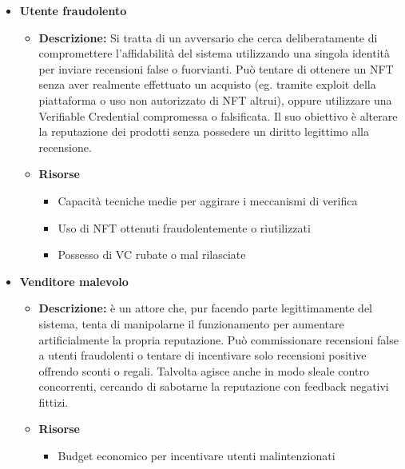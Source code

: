         \begin{itemize}
            \item \textbf{Utente fraudolento}
                \begin{itemize}                    
                    \item \textbf{Descrizione:}  Si tratta di un avversario che cerca deliberatamente di compromettere l'affidabilità del sistema utilizzando una singola identità per inviare recensioni false o fuorvianti. Può tentare di ottenere un NFT senza aver realmente effettuato un acquisto (eg. tramite exploit della piattaforma o uso non autorizzato di NFT altrui), oppure utilizzare una Verifiable Credential compromessa o falsificata. Il suo obiettivo è alterare la reputazione dei prodotti senza possedere un diritto legittimo alla recensione.
                   
                    \item \textbf{Risorse}
                        \begin{itemize}
                            \item Capacità tecniche medie per aggirare i meccanismi di verifica
    
                            \item Uso di NFT ottenuti fraudolentemente o riutilizzati
    
                            \item Possesso di VC rubate o mal rilasciate
                        \end{itemize}
                \end{itemize}
    
            \item \textbf{Venditore malevolo}
                \begin{itemize}                    
                    \item \textbf{Descrizione:} è un attore che, pur facendo parte legittimamente del sistema, tenta di manipolarne il funzionamento per aumentare artificialmente la propria reputazione. Può commissionare recensioni false a utenti fraudolenti o tentare di incentivare solo recensioni positive offrendo sconti o regali. Talvolta agisce anche in modo sleale contro concorrenti, cercando di sabotarne la reputazione con feedback negativi fittizi.
                    
                    \item \textbf{Risorse}
                        \begin{itemize}
                            \item Budget economico per incentivare utenti malintenzionati
        

\end{itemize}
\end{itemize}
\end{itemize}
